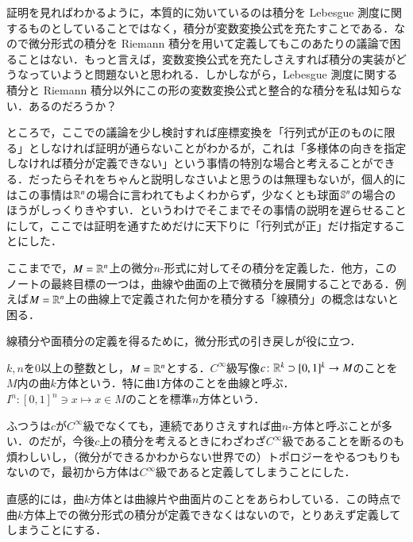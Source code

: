 \begin{dig}
証明を見ればわかるように，本質的に効いているのは積分を Lebesgue 測度に関するものとしていることではなく，積分が変数変換公式を充たすことである．なので微分形式の積分を Riemann 積分を用いて定義してもこのあたりの議論で困ることはない．もっと言えば，変数変換公式を充たしさえすれば積分の実装がどうなっていようと問題ないと思われる．しかしながら，Lebesgue 測度に関する積分と Riemann 積分以外にこの形の変数変換公式と整合的な積分を私は知らない．あるのだろうか？
\end{dig}


\begin{dig}
ところで，ここでの議論を少し検討すれば座標変換を「行列式が正のものに限る」としなければ証明が通らないことがわかるが，これは「多様体の向きを指定しなければ積分が定義できない」という事情の特別な場合と考えることができる．だったらそれをちゃんと説明しなさいよと思うのは無理もないが，個人的にはこの事情は$\mathbb{R}^n$の場合に言われてもよくわからず，少なくとも球面$\mathbb{S}^n$の場合のほうがしっくりきやすい．というわけでそこまでその事情の説明を遅らせることにして，ここでは証明を通すためだけに天下りに「行列式が正」だけ指定することにした．
\end{dig}

ここまでで，$M=\mathbb{R}^n$上の微分$n$-形式に対してその積分を定義した．他方，このノートの最終目標の一つは，曲線や曲面の上で微積分を展開することである．例えば$M=\mathbb{R}^n$上の曲線上で定義された何かを積分する「線積分」の概念はないと困る．

線積分や面積分の定義を得るために，微分形式の引き戻しが役に立つ．

\begin{defi}
$k,n$を0以上の整数とし，$M=\mathbb{R}^n$とする．$C^\infty$級写像$c \colon \mathbb{R}^k \supset [0,1]^k \to M$のことを$M$内の曲$k$方体という．特に曲1方体のことを曲線と呼ぶ．$I^n \colon [0,1]^n \ni x \mapsto x \in M$のことを標準$n$方体という．
\end{defi}

\begin{dig}
ふつうは$c$が$C^\infty$級でなくても，連続でありさえすれば曲$n$-方体と呼ぶことが多い．のだが，今後$c$上の積分を考えるときにわざわざ$C^\infty$級であることを断るのも煩わしいし，（微分ができるかわからない世界での）トポロジーをやるつもりもないので，最初から方体は$C^\infty$級であると定義してしまうことにした．
\end{dig}

直感的には，曲$k$方体とは曲線片や曲面片のことをあらわしている．この時点で曲$k$方体上での微分形式の積分が定義できなくはないので，とりあえず定義してしまうことにする．

